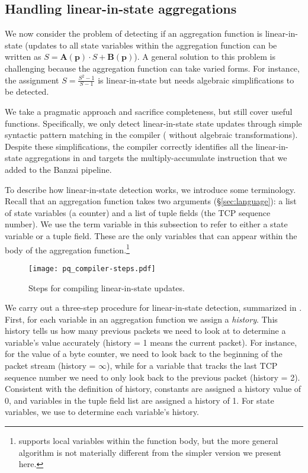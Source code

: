 \subsection{Handling linear-in-state aggregations}
\label{sec:linear-in-state-compilation}

We now consider the problem of detecting if an aggregation function is
linear-in-state (\ie updates to all state variables within the aggregation
function can be written as
$S = \boldsymbol{A}(\mathbf{p}) \cdot S + \boldsymbol{B}(\mathbf{p})$).
A general solution to
this problem is challenging because the aggregation function can take varied
forms. For instance, the assignment $S = \frac{S^2 - 1}{S -1}$ is
linear-in-state but needs algebraic simplifications to be detected.

We take a pragmatic approach and sacrifice completeness, but still cover useful
functions. Specifically, we only detect linear-in-state state updates through
simple syntactic pattern matching in the compiler (\ie 
without algebraic transformations).  Despite these simplifications, the \TheSystem
compiler correctly identifies all the linear-in-state aggregations in
 and targets the multiply-accumulate
instruction that we added to the Banzai pipeline.

To describe how linear-in-state detection works, we introduce some
terminology.  Recall that an aggregation function takes two arguments
(\S\ref{sec:language}): a list of state variables (\eg a counter) and a list of
tuple fields (\eg the TCP sequence number). We use the term variable in this
subsection to refer to either a state variable or a tuple field. These are the only variables that can appear within the body
of the aggregation function.\footnote{\TheSystem supports local variables within
  the function body, but the more general algorithm is not materially
  different from the simpler version we present here.}

\begin{figure}
\centering
\texttt{[image: pq\_compiler-steps.pdf]}
\caption{Steps for compiling linear-in-state updates.}
\label{fig:compiler-steps}
\end{figure}

We carry out a three-step procedure for linear-in-state
detection, summarized in .  First, for each variable in an
aggregation function we assign a {\em history}.  This history tells us how many
previous packets we need to look at to determine a variable's value accurately
(history = 1 means the current packet). For instance, for the value of a byte
counter, we need to look back to the beginning of the packet stream (history =
$\infty$), while for a variable that tracks the last TCP sequence number
we need to only look back to the previous packet (history = 2). Consistent with
the definition of history, constants are assigned a history value of 0, and
variables in the tuple field list are assigned a history of 1. For state
variables, we use  to determine each variable's history.

